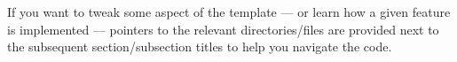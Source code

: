 
\begin{remark}
    If you want to tweak some aspect of the template --- or learn how a given feature is implemented --- pointers to the relevant directories/files are provided next to the subsequent section/subsection titles to help you navigate the code.
\end{remark}


